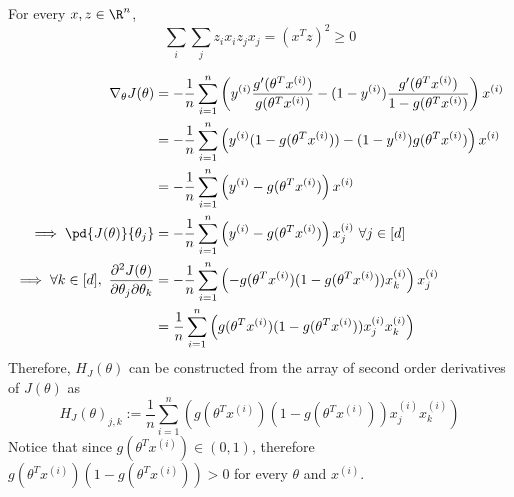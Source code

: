 \documentclass[11pt]{article}
\newcommand{\upi}[0]{^{(i)}}
\begin{document}
	\begin{lemma} For every $x, z \in \R^n$,
		\begin{equation}
			\sum_i \sum_j z_i x_i z_j x_j = (x^T z)^2 \geq 0
		\end{equation}
	\end{lemma}
	\begin{align}
		\nabla_\theta J(\theta) &= - \frac{1}{n} \sum_{i=1}^n \left(
		y\upi \frac{g'(\theta^T x\upi)}{g(\theta^T x\upi)}
		- (1 - y\upi) \frac{g'(\theta^T x\upi)}{1-g(\theta^T x\upi)}
		\right) x\upi \\
		&= - \frac{1}{n} \sum_{i=1}^n \left(
		y\upi (1 - g(\theta^T x\upi)) - (1 - y\upi) g(\theta^T x\upi)
		\right) x\upi \\
		&= - \frac{1}{n} \sum_{i=1}^n \left(
		y\upi - g(\theta^T x\upi)
		\right ) x\upi \\
		\implies \pd{J(\theta)}{\theta_j} &= - \frac{1}{n} \sum_{i=1}^n \left(
		y\upi - g(\theta^T x\upi)
		\right ) x\upi_j\ \forall j \in [d]\\
		\implies \forall k \in [d],\ \frac{\partial^2 J(\theta)}{\partial \theta_j \partial \theta_k} &= -\frac{1}{n}\sum_{i=1}^n \left (
		- g(\theta^T x\upi) (1-g(\theta^T x\upi)) x\upi_k
		\right) x\upi_j \\
		&= \frac{1}{n}\sum_{i=1}^n \left (
		g(\theta^T x\upi) (1-g(\theta^T x\upi)) x\upi_j x\upi_k
		\right)
	\end{align}
	Therefore, $H_J (\theta)$ can be constructed from the array of second order derivatives of $J(\theta)$ as 
	\begin{equation}
		H_J(\theta)_{j, k} := \frac{1}{n}\sum_{i=1}^n \left (
		g(\theta^T x\upi) (1-g(\theta^T x\upi)) x\upi_j x\upi_k
		\right)
	\end{equation}
	Notice that since $g(\theta^T x\upi) \in (0, 1)$, therefore $g(\theta^T x\upi) (1-g(\theta^T x\upi)) > 0$ for every $\theta$ and $x\upi$.
\end{document}
